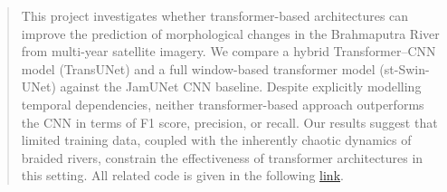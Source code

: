 \documentclass[10pt,oneside,a4paper,english]{article}
\begin{document}

\clearpage
\setcounter{page}{1}

\begin{abstract}
    \noindent This project investigates whether transformer-based architectures can improve the prediction of morphological changes in the Brahmaputra River from multi-year satellite imagery. We compare a hybrid Transformer–CNN model (TransUNet) and a full window-based transformer model (st-Swin-UNet) against the JamUNet CNN baseline. Despite explicitly modelling temporal dependencies, neither transformer-based approach outperforms the CNN in terms of F1 score, precision, or recall. Our results suggest that limited training data, coupled with the inherently chaotic dynamics of braided rivers, constrain the effectiveness of transformer architectures in this setting. All related code is given in the following \href{https://github.com/Romultra/River-Morpho-ML.git}{link}.
\end{abstract}
\end{document}
